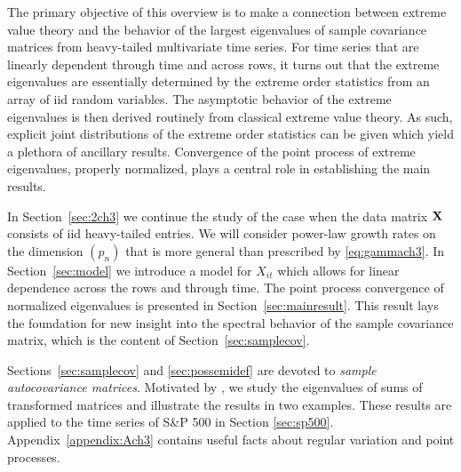 The primary objective of this overview  is to make a connection between extreme value theory and the behavior of the largest eigenvalues of sample covariance matrices from heavy-tailed multivariate time series.  For time series that are linearly dependent through time and across rows, it turns out that the extreme eigenvalues are essentially determined by the extreme order statistics from an array of iid random variables.  The asymptotic behavior of the extreme eigenvalues is then derived routinely from classical extreme value theory.  As such, explicit joint distributions of the extreme order statistics can be given which yield a plethora of ancillary results.  
Convergence of the point process of extreme eigenvalues, properly normalized, plays a central role in establishing the main results.
\par
In Section~\ref{sec:2ch3} we continue the study of the case when the data matrix ${\mathbf X}$ consists of iid heavy-tailed entries.  We will consider power-law growth rates on the dimension $(p_n)$ that is more general than prescribed by \eqref{eq:gammach3}.
In Section~\ref{sec:model} we introduce a model for $X_{it}$ which allows for linear dependence across the rows and through time.
The point process convergence of normalized eigenvalues is presented in Section~\ref{sec:mainresult}.
This result lays the foundation for new insight into the spectral behavior of the sample covariance matrix, which is the content of Section~\ref{sec:samplecov}.

Sections~\ref{sec:samplecov} and \ref{sec:possemidef} are devoted to {\em sample autocovariance matrices}.  Motivated by \cite{lam:yao}, we study the eigenvalues of sums of transformed matrices and illustrate the results in two examples. These results are applied to the time series of S\&P 500 in Section \ref{sec:sp500}.
Appendix~\ref{appendix:Ach3} contains useful facts about regular variation and point processes.




